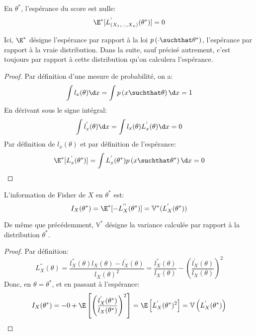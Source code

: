 \documentclass[info, math, french]{mpb-cours}
\def\model#1#2{p\left(#1\suchthat#2\right)}
\def\tstar{\theta^{*}}
\def\V{\mathbb{V}}
\def\Lpri#1{L_{#1}^{'}}
\def\Lsec#1{L_{#1}^{''}}
\def\lpri#1{l_{#1}^{'}}
\def\lsec#1{l_{#1}^{''}}
\begin{document}
\begin{thm}
	En $\tstar$, l'espérance du score est nulle:
	\begin{equation*}
		\E^{*}[L_{(X_{1}, \ldots, X_{n})}^{'}(\tstar)] = 0
	\end{equation*}
\end{thm}
Ici, $\E^{*}$ désigne l'espérance par rapport à la loi $\model{\cdot}{\tstar}$, l'espérance par rapport à la vraie distribution.
Dans la suite, sauf précisé autrement, c'est toujours par rapport à cette distribution qu'on calculera l'espérance.
\begin{proof}
	Par définition d'une mesure de probabilité, on a:
	\begin{equation*}
		\int l_{x}(\theta) \d x = \int \model{x}{\theta}  \d x = 1
	\end{equation*}
	En dérivant sous le signe intégral:
	\begin{equation*}
		\int \lpri{x}(\theta) \d x = \int l_{x}(\theta)\Lpri{x}(\theta) \d x = 0
	\end{equation*}
	Par définition de $l_{x}(\theta)$ et par définition de l'espérance:
	\begin{equation*}
		\E^{*}[\Lpri{x}(\tstar)] = \int \Lpri{x}(\tstar) \model{x}{\tstar}\d x = 0
	\end{equation*}
\end{proof}


\begin{thm}
	L'information de Fisher de $X$ en $\tstar$ est:
	\begin{equation*}
		I_{X}(\tstar) = \E^{*}[-L_{X}^{''}(\tstar)] = \V^{*}(L_{X}^{'}(\tstar))
	\end{equation*}
\end{thm}
De même que précédemment, $\V^{*}$ désigne la variance calculée par rapport à la distribution $\tstar$.
\begin{proof}
	Par définition:
	\begin{equation*}
		\Lsec{X}(\theta) = \frac{\lsec{X}(\theta)l_{X}(\theta) - \lpri{X}(\theta)}{l_{X}(\theta)^{2}} = \frac{\lsec{X}(\theta)}{l_{X}(\theta)} - \left(\frac{\lpri{X}(\theta)}{l_{X}(\theta)}\right)^{2}
	\end{equation*}
	Donc, en $\theta = \tstar$, et en passant à l'espérance:
	\begin{equation*}
		I_{X}(\tstar) = - 0 + \E\left[\left(\frac{\lpri{X}(\tstar)}{l_{X}(\tstar)}\right)^{2}\right] = \E\left[\Lpri{X}(\tstar)^{2}\right] = \V\left(\Lpri{X}(\tstar)\right)
	\end{equation*}
\end{proof}
\end{document}
